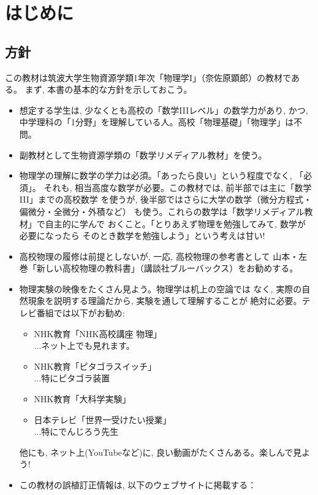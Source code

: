 \chapter{はじめに}

\section{方針}

この教材は筑波大学生物資源学類1年次「物理学I」（奈佐原顕郎）の教材である。
まず, 本書の基本的な方針を示しておこう。

\begin{itemize}
\item 想定する学生は, 少なくとも高校の「数学IIIレベル」の数学力があり, かつ, 
中学理科の「1分野」を理解している人。高校「物理基礎」「物理学」は不問。
\item 副教材として生物資源学類の「数学リメディアル教材」を使う。
\item 物理学の理解に数学の学力は必須。「あったら良い」という程度でなく, 「必須」。
それも, 相当高度な数学が必要。この教材では, 前半部では主に「数学III」までの高校数学
を使うが, 後半部ではさらに大学の数学（微分方程式・偏微分・全微分・外積など）
も使う。これらの数学は「数学リメディアル教材」で自主的に学んで
おくこと。「とりあえず物理を勉強してみて, 数学が必要になったら
そのとき数学を勉強しよう」という考えは甘い!
\item 高校物理の履修は前提としないが, 一応, 高校物理の参考書として
山本・左巻「新しい高校物理の教科書」（講談社ブルーバックス）をお勧めする。
\item 物理実験の映像をたくさん見よう。物理学は机上の空論では
なく, 実際の自然現象を説明する理論だから, 実験を通して理解することが
絶対に必要。テレビ番組では以下がお勧め: 
\begin{itemize}
\item NHK教育「NHK高校講座 物理」\\...ネット上でも見れます。
\item NHK教育「ピタゴラスイッチ」\\...特にピタゴラ装置
\item NHK教育「大科学実験」
\item 日本テレビ「世界一受けたい授業」\\...特にでんじろう先生
\end{itemize}
他にも, ネット上(YouTubeなど)に, 良い動画がたくさんある。楽しんで見よう!
\item この教材の誤植訂正情報は, 以下のウェブサイトに掲載する：\\

\end{itemize}
